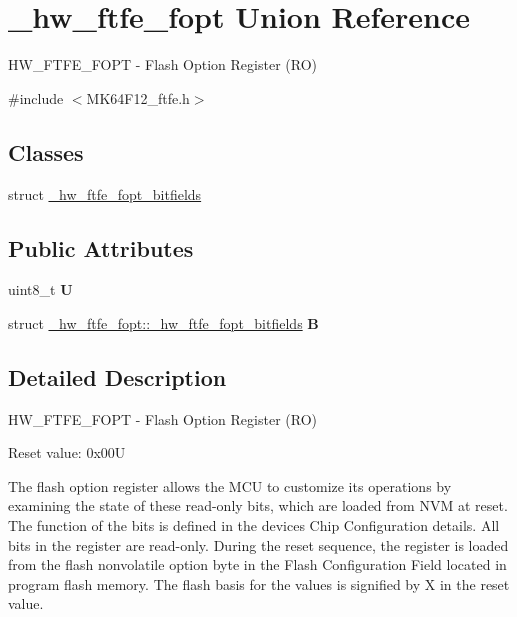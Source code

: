 \hypertarget{union__hw__ftfe__fopt}{}\section{\+\_\+hw\+\_\+ftfe\+\_\+fopt Union Reference}
\label{union__hw__ftfe__fopt}


H\+W\+\_\+\+F\+T\+F\+E\+\_\+\+F\+O\+PT -\/ Flash Option Register (RO)  




{\ttfamily \#include $<$M\+K64\+F12\+\_\+ftfe.\+h$>$}

\subsection*{Classes}
\begin{DoxyCompactItemize}
\item 
struct \hyperlink{struct__hw__ftfe__fopt_1_1__hw__ftfe__fopt__bitfields}{\+\_\+hw\+\_\+ftfe\+\_\+fopt\+\_\+bitfields}
\end{DoxyCompactItemize}
\subsection*{Public Attributes}
\begin{DoxyCompactItemize}
\item 
uint8\+\_\+t {\bfseries U}\hypertarget{union__hw__ftfe__fopt_abf14970a86a0e68dad9599b6eadfafb8}{}\label{union__hw__ftfe__fopt_abf14970a86a0e68dad9599b6eadfafb8}

\item 
struct \hyperlink{struct__hw__ftfe__fopt_1_1__hw__ftfe__fopt__bitfields}{\+\_\+hw\+\_\+ftfe\+\_\+fopt\+::\+\_\+hw\+\_\+ftfe\+\_\+fopt\+\_\+bitfields} {\bfseries B}\hypertarget{union__hw__ftfe__fopt_aaa200dd53d250c310e383a8668b9174e}{}\label{union__hw__ftfe__fopt_aaa200dd53d250c310e383a8668b9174e}

\end{DoxyCompactItemize}


\subsection{Detailed Description}
H\+W\+\_\+\+F\+T\+F\+E\+\_\+\+F\+O\+PT -\/ Flash Option Register (RO) 

Reset value\+: 0x00U

The flash option register allows the M\+CU to customize its operations by examining the state of these read-\/only bits, which are loaded from N\+VM at reset. The function of the bits is defined in the device\textquotesingle{}s Chip Configuration details. All bits in the register are read-\/only. During the reset sequence, the register is loaded from the flash nonvolatile option byte in the Flash Configuration Field located in program flash memory. The flash basis for the values is signified by X in the reset value. 

